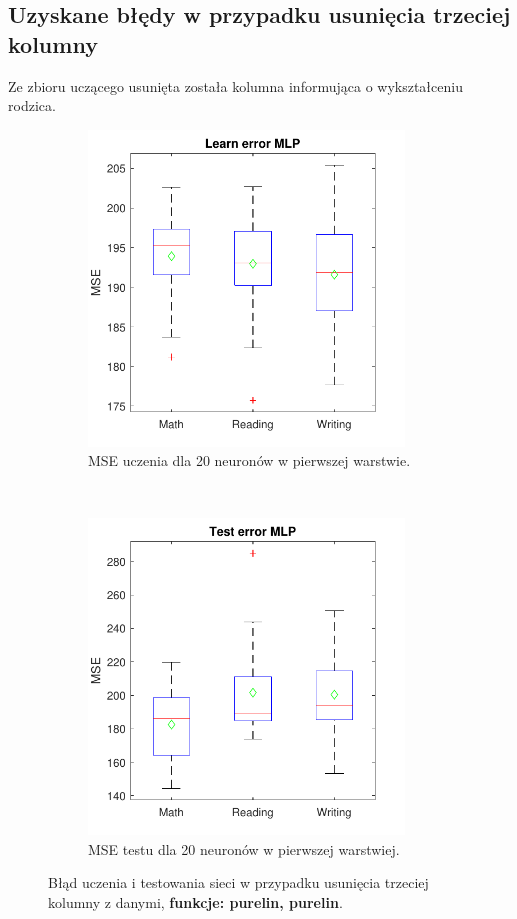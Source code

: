 \documentclass[12pt]{article}
\begin{document}
\subsection{Uzyskane błędy w przypadku usunięcia trzeciej kolumny}
Ze zbioru uczącego usunięta została kolumna informująca o wykształceniu rodzica.

\begin{figure}[H]
\centering
\begin{subfigure}[t]{0.48\textwidth} 
\centering
\includegraphics[height=3.3in]{purelin_purelin_20_without_3_learnBoxplot.pdf}
\caption{MSE uczenia dla  20 neuronów w pierwszej warstwie.}
\end{subfigure}
~~
\begin{subfigure}[t]{0.48\textwidth} 
\centering
\includegraphics[height=3.3in]{purelin_purelin_20_without_3_testBoxplot.pdf}
\caption{MSE testu dla  20  neuronów w pierwszej warstwiej.}
\end{subfigure}

\caption{Błąd uczenia i testowania sieci w przypadku usunięcia trzeciej  kolumny z danymi, \textbf{funkcje: purelin, purelin}.}
\end{figure}
\end{document}

